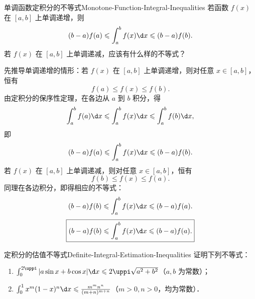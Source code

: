\begin{problem}{单调函数定积分的不等式}{Monotone-Function-Integral-Inequalities}
    若函数 $f(x)$ 在 $[a, b]$ 上单调递增，则
    \begin{equation}
        (b - a)f(a) \leqslant \int_a^b f(x) \d x \leqslant (b - a)f(b).
    \end{equation}
    若 $f(x)$ 在 $[a, b]$ 上单调递减，应该有什么样的不等式？
\end{problem}

\begin{solution}
    先推导单调递增的情形：若 $f(x)$ 在 $[a, b]$ 上单调递增，则对任意 $x \in [a, b]$，恒有
    \begin{equation}
        f(a) \leqslant f(x) \leqslant f(b).
    \end{equation}
    由定积分的保序性定理，在各边从 $a$ 到 $b$ 积分，得
    \begin{equation}
        \int_a^b f(a) \d x \leqslant \int_a^b f(x) \d x \leqslant \int_a^b f(b) \d x,
    \end{equation}
    即
    \begin{equation}
        (b - a)f(a) \leqslant \int_a^b f(x) \d x \leqslant (b - a)f(b).
    \end{equation}
    若 $f(x)$ 在 $[a, b]$ 上单调递减，则对任意 $x \in [a, b]$，恒有
    \begin{equation}
        f(b) \leqslant f(x) \leqslant f(a).
    \end{equation}
    同理在各边积分，即得相应的不等式：
    \begin{equation}
        (b - a)f(b) \leqslant \int_a^b f(x) \d x \leqslant (b - a)f(a).
    \end{equation}
    \begin{equation}
        \boxed{(b - a)f(b) \leqslant \int_a^b f(x) \d x \leqslant (b - a)f(a).}
    \end{equation}
\end{solution}

\begin{problem}{定积分的估值不等式}{Definite-Integral-Estimation-Inequalities}
    证明下列不等式：
    \begin{enumerate}
        \item $\int_0^{2\uppi} |a\sin x + b\cos x| \d x \leqslant 2\uppi\sqrt{a^2 + b^2}$（$a, b$ 为常数）；
        \item $\int_0^1 x^m (1 - x)^n \d x \leqslant \frac{m^m n^n}{(m + n)^{m+n}}$（$m > 0, n > 0$，均为常数）．
    \end{enumerate}
\end{problem}

